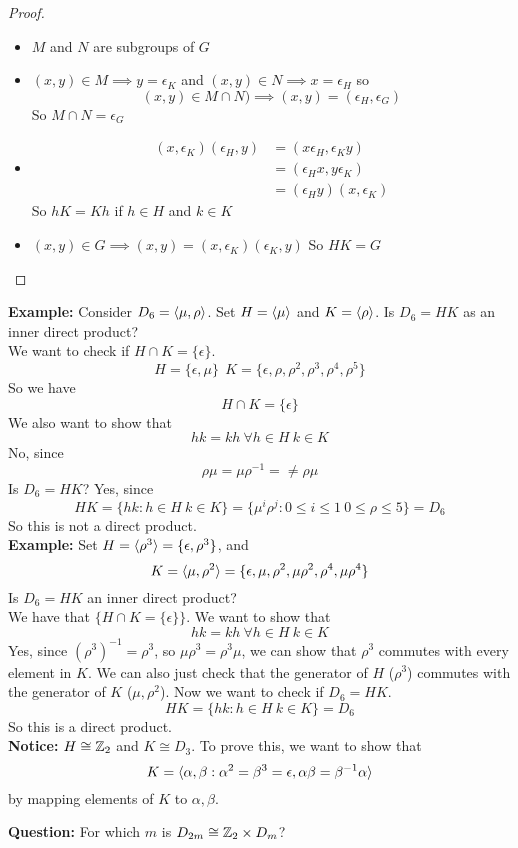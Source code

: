 \documentclass[openany]{report}
\begin{document}
\begin{proof}
    \begin{itemize}
        \item $M$ and $N$ are subgroups of $G$
        \item $(x,y) \in M \implies  y = \epsilon_K$ and $(x,y) \in N \implies x = \epsilon_H$
        so 
        \[(x,y) \in M \cap N) \implies (x,y) = (\epsilon_H, \epsilon_G)\]
        So $M \cap N = \epsilon_G$
        \item \begin{align*}
            (x,\epsilon_K)(\epsilon_H, y) &= (x\epsilon_H, \epsilon_Ky)\\
            &= (\epsilon_Hx, y\epsilon_K)\\
            &= (\epsilon_Hy)(x,\epsilon_K)
        \end{align*}
        So $hK = Kh$ if $h \in H$ and $k \in K$
        \item $(x,y) \in G \implies (x,y) = (x,\epsilon_K)(\epsilon_K, y)$ So $HK = G$
    \end{itemize}
\end{proof}
\textbf{Example:} Consider $D_6 = \langle \mu,\rho \rangle$. Set $H = \langle \mu \rangle$ and $K = \langle \rho \rangle$. Is $D_6 = HK$ as an inner direct product?\\[2ex]
We want to check if $H \cap K = \{\epsilon\}$.
\[H = \{\epsilon, \mu\} \ \ K = \{\epsilon, \rho, \rho^2, \rho^3, \rho^4, \rho^5\}\]
So we have 
\[H \cap K = \{\epsilon\}\]
We also want to show that 
\[hk = kh \ \forall h \in H \ k \in K\]
No, since 
\[\rho\mu = \mu\rho^{-1} = \neq \rho\mu\]
Is $D_6 = HK$? Yes, since 
\[HK = \{hk: h \in H \ k \in K\} = \{\mu^i\rho^j: 0 \leq i \leq 1 \ 0 \leq \rho \leq 5\} = D_6\]
So this is not a direct product. \\[3ex]
\textbf{Example:} Set $H = \langle \rho^3 \rangle = \{\epsilon, \rho^3\}$, and 
\[K = \langle \mu, \rho^2 \rangle = \{\epsilon, \mu,\rho^2, \mu\rho^2, \rho^4, \mu\rho^4\}\]
Is $D_6 = HK$ an inner direct product?\\[2ex]
We have that $\{H \cap K = \{\epsilon\}\}$. We want to show that 
\[hk = kh \ \forall h \in H \ k \in K\]
Yes, since $(\rho^3)^{-1} = \rho^3$, so $\mu\rho^3 = \rho^3\mu$, we can show that $\rho^3$ commutes with every element in $K$. We can also just check that the generator of $H$ ($\rho^3$) commutes with the generator of $K$ ($\mu,\rho^2$). Now we want to check if $D_6 = HK$. 
\[HK = \{hk : h \in H \ k \in K\} = D_6\] 
So this is a direct product.\\[3ex]
\textbf{Notice:} $H \cong \mathbb{Z}_2$ and $K \cong D_3$. To prove this, we want to show that 
\[K = \langle \alpha,\beta: \alpha^2 = \beta^3 = \epsilon, \alpha\beta = \beta^{-1}\alpha \rangle\]
by mapping elements of $K$ to $\alpha, \beta$.
\begin{center}
    \textbf{Question:} For which $m$ is $D_{2m} \cong \mathbb{Z}_2 \times D_m$?    
\end{center}
\end{document}
